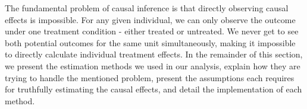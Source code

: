 \documentclass{article}
\newcommand{\gur}[1]{{\color{teal}{Gur: #1}}}
\begin{document}
The fundamental problem of causal inference is that directly observing causal effects is impossible. For any given individual, we can only observe the outcome under one treatment condition - either treated or untreated. We never get to see both potential outcomes for the same unit simultaneously, making it impossible to directly calculate individual treatment effects. In the remainder of this section, we present the estimation methods we used in our analysis, explain how they are trying to handle the mentioned problem, present the assumptions each requires for truthfully estimating the causal effects, and detail the implementation of each method.







\end{document}
